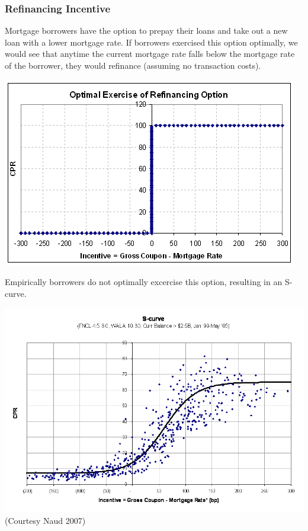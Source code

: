 \documentclass[10pt,letterpaper]{article}
\begin{document}
\subsubsection{Refinancing Incentive}
Mortgage borrowers have the option to prepay their loans and take out a new loan with a lower mortgage rate. If borrowers exercised this option optimally, we would see that anytime the current mortgage rate falls below the mortgage rate of the borrower, they would refinance (assuming no transaction costs).
\begin{center}
\includegraphics[scale=0.5]{optimalexercise.png}\\
\end{center}
Empirically borrowers do not optimally excercise this option, resulting in an S-curve.
\begin{center}
\includegraphics[scale=0.3]{suboptimalexercise.png}\\
(Courtesy Naud 2007)
\end{center}
\end{document}
